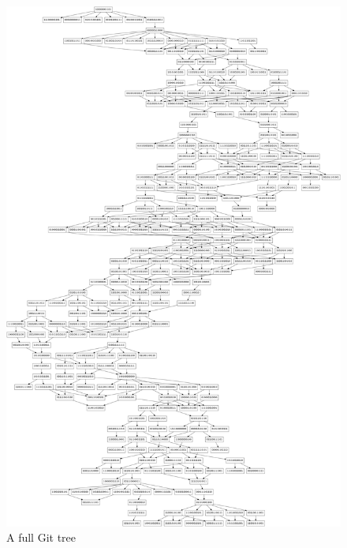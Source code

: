 \begin{figure}[H]
 \includegraphics[width = \textwidth]{./image/DagGen/outputbig.png}
 \caption{A full Git tree}
\end{figure}